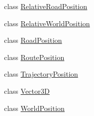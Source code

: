 \begin{DoxyCompactItemize}
class \hyperlink{classimplementation_1_1data__model_1_1positions_1_1_relative_road_position}{Relative\+Road\+Position}
\item 
class \hyperlink{classimplementation_1_1data__model_1_1positions_1_1_relative_world_position}{Relative\+World\+Position}
\item 
class \hyperlink{classimplementation_1_1data__model_1_1positions_1_1_road_position}{Road\+Position}
\item 
class \hyperlink{classimplementation_1_1data__model_1_1positions_1_1_route_position}{Route\+Position}
\item 
class \hyperlink{classimplementation_1_1data__model_1_1positions_1_1_trajectory_position}{Trajectory\+Position}
\item 
class \hyperlink{classimplementation_1_1data__model_1_1positions_1_1_vector3_d}{Vector3D}
\item 
class \hyperlink{classimplementation_1_1data__model_1_1positions_1_1_world_position}{World\+Position}
\end{DoxyCompactItemize}
